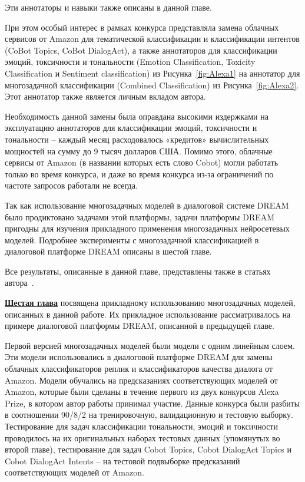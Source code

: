 Эти аннотаторы и навыки также описаны в данной главе. 

При этом особый интерес в рамках конкурса представляла замена облачных сервисов от Amazon для тематической классификации и классификации интентов (CoBot Topics, CoBot DialogAct), а также аннотаторов для классификации эмоций, токсичности и тональности (Emotion Classification, Toxicity Classification и Sentiment classification) из Рисунка~\ref{fig:Alexa1} на аннотатор для многозадачной классификации (Combined Classification) из Рисунка~\ref{fig:Alexa2}. Этот аннотатор также является личным вкладом автора.

Необходимость данной замены была оправдана высокими издержками на эксплуатацию аннотаторов для классификации эмоций, токсичности и тональности -- каждый месяц расходовалось «кредитов» вычислительных мощностей на сумму до 9 тысяч долларов США. Помимо этого, облачные сервисы от Amazon (в названии которых есть слово Cobot) могли работать только во время конкурса, и даже во время конкурса из-за ограничений по частоте запросов работали не всегда.

Так как использование многозадачных моделей в диалоговой системе DREAM было продиктовано задачами этой платформы, задачи платформы DREAM пригодны для изучения прикладного применения многозадачных нейросетевых моделей. Подробнее эксперименты с многозадачной классификацией в диалоговой платформе DREAM описаны в шестой главе.

Все результаты, описанные в данной главе, представлены также в статьях автора~\cite{dream1,dream1_trudy,dream2,mtldream}.

\underline{\textbf{Шестая глава}} посвящена прикладному использованию многозадачных моделей, описанных в данной работе. Их прикладное использование рассматривалось на примере диалоговой платформы DREAM, описанной в предыдущей главе.

Первой версией многозадачных моделей были модели с одним линейным слоем. Эти модели использовались в диалоговой платформе DREAM для замены облачных классификаторов реплик и классификаторов качества диалога от Amazon. Модели обучались на предсказаниях соответствующих моделей от Amazon, которые были сделаны в течение первого из двух конкурсов Alexa Prize, в котором автор работы принимал участие. Данные конкурса были разбиты в соотношении 90/8/2 на тренировочную, валидационную и тестовую выборку. Тестирование для задач классификации тональности, эмоций и токсичности проводилось на их оригинальных наборах тестовых данных (упомянутых во второй главе), тестирование для задач Cobot Topics, Cobot DialogAct Topics и Cobot DialogAct Intents -- на тестовой подвыборке предсказаний соответствующих моделей от Amazon.

